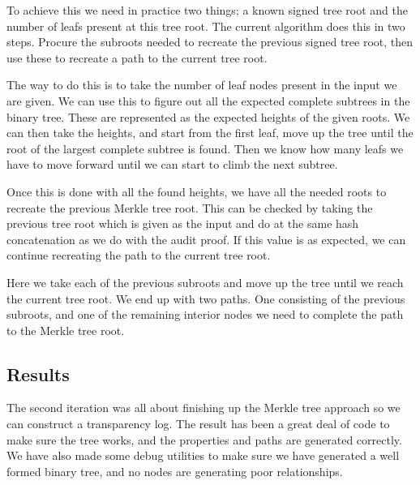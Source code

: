 \documentclass[../Main/thesis.tex]{subfiles}
\begin{document}
To achieve this we need in practice two things; a known signed tree root and the
number of leafs present at this tree root. The current algorithm does this in
two steps. Procure the subroots needed to recreate the previous signed tree
root, then use these to recreate a path to the current tree root. 

The way to do this is to take the number of leaf nodes present in the input we
are given. We can use this to figure out all the expected complete subtrees in
the binary tree. These are represented as the expected heights of the given
roots. We can then take the heights, and start from the first leaf, move up the
tree until the root of the largest complete subtree is found. Then we know how
many leafs we have to move forward until we can start to climb the next subtree.

Once this is done with all the found heights, we have all the needed roots to
recreate the previous Merkle tree root. This can be checked by taking the
previous tree root which is given as the input and do at the same hash
concatenation as we do with the audit proof. If this value is as expected, we
can continue recreating the path to the current tree root.

Here we take each of the previous subroots and move up the tree until we reach
the current tree root. We end up with two paths. One consisting of the previous
subroots, and one of the remaining interior nodes we need to complete the path
to the Merkle tree root.

\subsection*{Results}%
\label{sub:second_iteration_results}
The second iteration was all about finishing up the Merkle tree approach so we
can construct a transparency log. The result has been a great deal of code to
make sure the tree works, and the properties and paths are generated correctly.
We have also made some debug utilities to make sure we have generated a well
formed binary tree, and no nodes are generating poor relationships.
\end{document}
